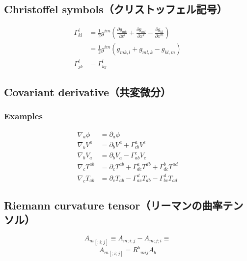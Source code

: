 %
%
\subsection{Christoffel symbols（クリストッフェル記号）}
\begin{align}
  {\Gamma }^{i}_{kl}
    & = \frac{1}{2} g^{im} \left( \frac{\partial g_{mk}}{\partial x^l} + \frac{\partial g_{ml}}{\partial x^k} - \frac{\partial g_{kl}}{\partial x^m} \right) \\
    & = \frac{1}{2} g^{im} \left( g_{mk,l} + g_{ml,k} - g_{kl,m} \right) \\
  {\Gamma }^{i}_{jk}
    & = {\Gamma }^{i}_{kj}
\end{align}


%
%
\subsection{Covariant derivative（共変微分）}
\subsubsection{Examples}
\begin{align}
  {\nabla }_a \phi
    & = {\partial }_a \phi \\
  {\nabla }_b V^a
    & = {\partial }_b V^a + {\Gamma }^{a}_{cb} V^c \\
  {\nabla }_b V_a
    & = {\partial }_b V_a - {\Gamma }^{c}_{ab} V_c \\
  {\nabla }_c T^{ab}
    & = {\partial }_c T^{ab} + {\Gamma }^{a}_{dc} T^{db} + {\Gamma }^{b}_{dc} T^{ad} \\
  {\nabla }_c T_{ab}
    & = {\partial }_c T_{ab} - {\Gamma }^{d}_{ac} T_{db} - {\Gamma }^{d}_{bc} T_{ad}
\end{align}


%
%
\subsection{Riemann curvature tensor（リーマンの曲率テンソル）}
\[ {A_m}_{ [ ;i ;j ] }  \equiv A_{m ;i ;j } - A_{m ;j ;i } \equiv  \]
\[ {A_m}_{ [ ;i ;j ] }  = {R^b}_{ mij } A_b \]

